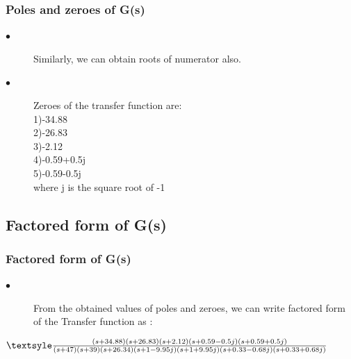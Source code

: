 \documentclass{beamer}
\theoremstyle{remark}
\begin{document}
\begin{frame}
\frametitle{Poles and zeroes of G(s)}
\begin{description}
\item[$\bullet$]Similarly, we can obtain roots of numerator also.
\item[$\bullet$]Zeroes of the transfer function are:\\
1)-34.88\\
2)-26.83\\
3)-2.12\\
4)-0.59+0.5j\\
5)-0.59-0.5j\\

\vspace{0.1 in}
where j is the square root of -1
\end{description}
\end{frame}












\subsection{Factored form of G(s)}
\begin{frame}
\frametitle{Factored form of G(s)}
\begin{description}
\item[$\bullet$]From the obtained values of poles and zeroes, we can write factored form of the Transfer function as :
\end{description}
\vspace{0.2 in}
\noindent 
 $ {\textsyle \frac{(s+34.88)(s+26.83)(s+2.12)(s+0.59-0.5j)(s+0.59+0.5j)}{(s+47)(s+39)(s+26.34)(s+1-9.95j)(s+1+9.95j)(s+0.33-0.68j)(s+0.33+0.68j)}} $\\
\noindent
\vspace{0.1 in}

\end{frame}
\end{document}

